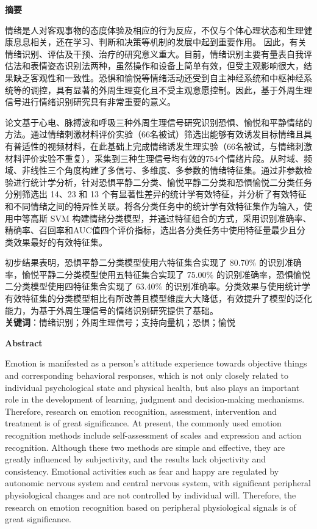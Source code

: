 \cleardoublepage{}
\begin{center}
    \bfseries {} 摘要
\end{center}

情绪是人对客观事物的态度体验及相应的行为反应，不仅与个体心理状态和生理健康息息相关，还在学习、判断和决策等机制的发展中起到重要作用。
因此，有关情绪识别、评估及干预、治疗的研究意义重大。目前，情绪识别主要有量表自我评估法和表情姿态识别法两种，虽然操作和设备上简单有效，但受主观影响很大，结果缺乏客观性和一致性。恐惧和愉悦等情绪活动还受到自主神经系统和中枢神经系统等的调控，具有显著的外周生理变化且不受主观意愿控制。因此，基于外周生理信号进行情绪识别研究具有非常重要的意义。 

论文基于心电、脉搏波和呼吸三种外周生理信号研究识别恐惧、愉悦和平静情绪的方法。通过情绪刺激材料评价实验（66名被试）筛选出能够有效诱发目标情绪且具有普适性的视频材料，在此基础上完成情绪诱发生理实验（66名被试，与情绪刺激材料评价实验不重复），采集到三种生理信号均有效的754个情绪片段。从时域、频域、非线性三个角度构建了多信号、多维度、多参数的情绪特征集。通过非参数检验进行统计学分析，针对恐惧平静二分类、愉悦平静二分类和恐惧愉悦二分类任务分别筛选出 14、23 和 13 个有显著性差异的统计学有效特征，并分析了有效特征和不同情绪之间的特异性关联。将各分类任务中的统计学有效特征集作为输入，使用中等高斯 SVM 构建情绪分类模型，并通过特征组合的方式，采用识别准确率、精确率、召回率和AUC值四个评价指标，选出各分类任务中使用特征量最少且分类效果最好的有效特征集。

初步结果表明，恐惧平静二分类模型使用六特征集合实现了 80.70\% 的识别准确率，愉悦平静二分类模型使用五特征集合实现了 75.00\% 的识别准确率，恐惧愉悦二分类模型使用四特征集合实现了 63.40\% 的识别准确率。分类效果与使用统计学有效特征集的分类模型相比有所改善且模型维度大大降低，有效提升了模型的泛化能力，为基于外周生理信号的情绪识别研究提供了基础。
~\\

\textbf{关键词}：情绪识别；外周生理信号；支持向量机；恐惧；愉悦
\cleardoublepage{}
\begin{center}
    \bfseries {} Abstract
\end{center}

Emotion is manifested as a person's attitude experience towards objective things and corresponding behavioral responses, which is not only closely related to individual psychological state and physical health, but also plays an important role in the development of learning, judgment and decision-making mechanisms. Therefore, research on emotion recognition, assessment, intervention and treatment is of great significance. At present, the commonly used emotion recognition methods include self-assessment of scales and expression and action recognition. Although these two methods are simple and effective, they are greatly influenced by subjectivity, and the results lack objectivity and consistency. Emotional activities such as fear and happy are regulated by autonomic nervous system and central nervous system, with significant peripheral physiological changes and are not controlled by individual will. Therefore, the research on emotion recognition based on peripheral physiological signals is of great significance.

